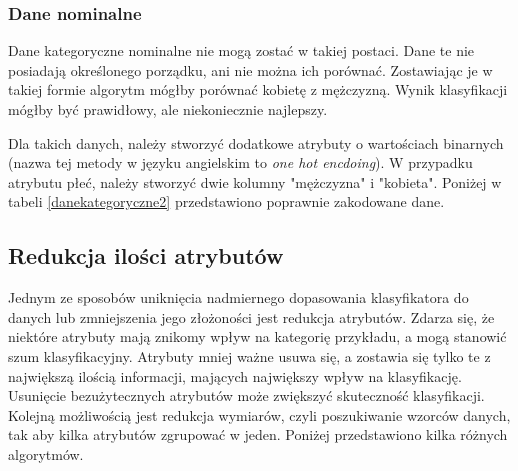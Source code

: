 \subsubsection{Dane nominalne}
Dane kategoryczne nominalne nie mogą zostać w takiej postaci. Dane te nie posiadają określonego porządku, ani nie można ich porównać. Zostawiając je w takiej formie algorytm mógłby porównać kobietę z mężczyzną. Wynik klasyfikacji mógłby być prawidłowy, ale niekoniecznie najlepszy. \par
Dla takich danych, należy stworzyć dodatkowe atrybuty o wartościach binarnych (nazwa tej metody w języku angielskim to \textit{one hot encdoing}). W przypadku atrybutu płeć, należy stworzyć dwie kolumny "mężczyzna" i "kobieta". Poniżej w tabeli \ref{danekategoryczne2} przedstawiono poprawnie zakodowane dane.
\begin{table}[H]
	\begin{center}
			\caption{Przykład z kategorycznymi danymi po odpowiednim kodowaniu.}
			\label{danekategoryczne2}
		\end{center}
	\end{table}
\subsection{Redukcja ilości atrybutów}
Jednym ze sposobów uniknięcia nadmiernego dopasowania klasyfikatora do danych lub zmniejszenia jego złożoności jest redukcja atrybutów. Zdarza się, że niektóre atrybuty mają znikomy wpływ na kategorię przykładu, a mogą stanowić szum klasyfikacyjny. Atrybuty mniej ważne usuwa się, a zostawia się tylko te z największą ilością informacji, mających największy wpływ na klasyfikację. Usunięcie bezużytecznych atrybutów może zwiększyć skuteczność klasyfikacji. Kolejną możliwością jest redukcja wymiarów, czyli poszukiwanie wzorców danych, tak aby kilka atrybutów zgrupować w jeden. Poniżej przedstawiono kilka różnych algorytmów.

